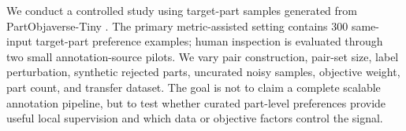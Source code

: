 \documentclass[10pt,twocolumn,letterpaper]{article}
\begin{document}
We conduct a controlled study using target-part samples generated from PartObjaverse-Tiny \cite{yang2024sampart3d}. The primary metric-assisted setting contains 300 same-input target-part preference examples; human inspection is evaluated through two small annotation-source pilots. We vary pair construction, pair-set size, label perturbation, synthetic rejected parts, uncurated noisy samples, objective weight, part count, and transfer dataset. The goal is not to claim a complete scalable annotation pipeline, but to test whether curated part-level preferences provide useful local supervision and which data or objective factors control the signal.
\end{document}
